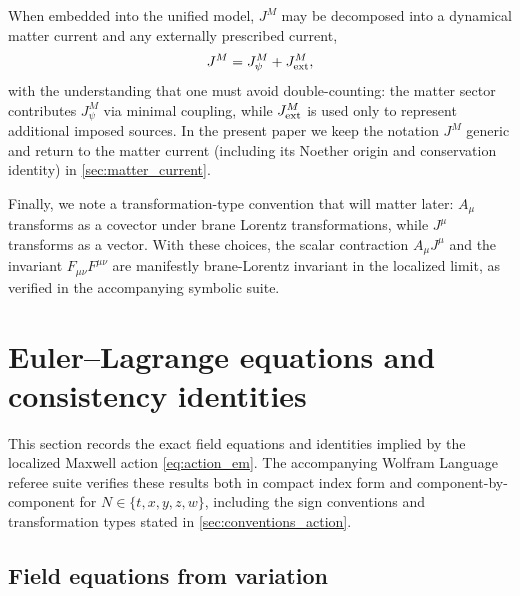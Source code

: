 \documentclass[11pt]{article}
\newcommand{\A}{A}
\newcommand{\F}{F}
\newcommand{\J}{J}
\begin{document}
When embedded into the unified model, \(\J^M\) may be decomposed into a dynamical
matter current and any externally prescribed current,
\begin{equation}
  \J^M = \J_\psi^M + \J_{\rm ext}^M,
\end{equation}
with the understanding that one must avoid double-counting: the matter sector
contributes \(\J_\psi^M\) via minimal coupling, while \(\J_{\rm ext}^M\) is used
only to represent additional imposed sources. In the present paper we keep the
notation \(\J^M\) generic and return to the matter current (including its Noether
origin and conservation identity) in \cref{sec:matter_current}.

Finally, we note a transformation-type convention that will matter later:
\(\A_\mu\) transforms as a covector under brane Lorentz transformations, while
\(\J^\mu\) transforms as a vector. With these choices, the scalar contraction
\(\A_\mu \J^\mu\) and the invariant \(\F_{\mu\nu}\F^{\mu\nu}\) are manifestly
brane-Lorentz invariant in the localized limit, as verified in the accompanying
symbolic suite.

\section{Euler--Lagrange equations and consistency identities}
\label{sec:eom_identities}

This section records the exact field equations and identities implied by the
localized Maxwell action \cref{eq:action_em}. The accompanying Wolfram Language
referee suite verifies these results both in compact index form and
component-by-component for \(N\in\{t,x,y,z,w\}\), including the sign conventions
and transformation types stated in \cref{sec:conventions_action}.

\subsection{Field equations from variation}
\label{sec:eom}
\end{document}
